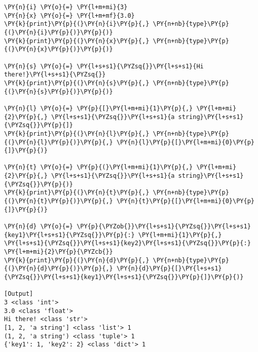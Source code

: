 \begin{Verbatim}[label=\makebox{\url{https://github.com/lucabaldini/cmepda/tree/master/slides/latex/snippets/basic\_types.py}},commandchars=\\\{\}]
\PY{n}{i} \PY{o}{=} \PY{l+m+mi}{3}
\PY{n}{x} \PY{o}{=} \PY{l+m+mf}{3.0}
\PY{k}{print}\PY{p}{(}\PY{n}{i}\PY{p}{,} \PY{n+nb}{type}\PY{p}{(}\PY{n}{i}\PY{p}{)}\PY{p}{)}
\PY{k}{print}\PY{p}{(}\PY{n}{x}\PY{p}{,} \PY{n+nb}{type}\PY{p}{(}\PY{n}{x}\PY{p}{)}\PY{p}{)}

\PY{n}{s} \PY{o}{=} \PY{l+s+s1}{\PYZsq{}}\PY{l+s+s1}{Hi there!}\PY{l+s+s1}{\PYZsq{}}
\PY{k}{print}\PY{p}{(}\PY{n}{s}\PY{p}{,} \PY{n+nb}{type}\PY{p}{(}\PY{n}{s}\PY{p}{)}\PY{p}{)}

\PY{n}{l} \PY{o}{=} \PY{p}{[}\PY{l+m+mi}{1}\PY{p}{,} \PY{l+m+mi}{2}\PY{p}{,} \PY{l+s+s1}{\PYZsq{}}\PY{l+s+s1}{a string}\PY{l+s+s1}{\PYZsq{}}\PY{p}{]}
\PY{k}{print}\PY{p}{(}\PY{n}{l}\PY{p}{,} \PY{n+nb}{type}\PY{p}{(}\PY{n}{l}\PY{p}{)}\PY{p}{,} \PY{n}{l}\PY{p}{[}\PY{l+m+mi}{0}\PY{p}{]}\PY{p}{)}

\PY{n}{t} \PY{o}{=} \PY{p}{(}\PY{l+m+mi}{1}\PY{p}{,} \PY{l+m+mi}{2}\PY{p}{,} \PY{l+s+s1}{\PYZsq{}}\PY{l+s+s1}{a string}\PY{l+s+s1}{\PYZsq{}}\PY{p}{)}
\PY{k}{print}\PY{p}{(}\PY{n}{t}\PY{p}{,} \PY{n+nb}{type}\PY{p}{(}\PY{n}{t}\PY{p}{)}\PY{p}{,} \PY{n}{t}\PY{p}{[}\PY{l+m+mi}{0}\PY{p}{]}\PY{p}{)}

\PY{n}{d} \PY{o}{=} \PY{p}{\PYZob{}}\PY{l+s+s1}{\PYZsq{}}\PY{l+s+s1}{key1}\PY{l+s+s1}{\PYZsq{}}\PY{p}{:} \PY{l+m+mi}{1}\PY{p}{,} \PY{l+s+s1}{\PYZsq{}}\PY{l+s+s1}{key2}\PY{l+s+s1}{\PYZsq{}}\PY{p}{:} \PY{l+m+mi}{2}\PY{p}{\PYZcb{}}
\PY{k}{print}\PY{p}{(}\PY{n}{d}\PY{p}{,} \PY{n+nb}{type}\PY{p}{(}\PY{n}{d}\PY{p}{)}\PY{p}{,} \PY{n}{d}\PY{p}{[}\PY{l+s+s1}{\PYZsq{}}\PY{l+s+s1}{key1}\PY{l+s+s1}{\PYZsq{}}\PY{p}{]}\PY{p}{)}

[Output]
3 <class 'int'>
3.0 <class 'float'>
Hi there! <class 'str'>
[1, 2, 'a string'] <class 'list'> 1
(1, 2, 'a string') <class 'tuple'> 1
{'key1': 1, 'key2': 2} <class 'dict'> 1
\end{Verbatim}